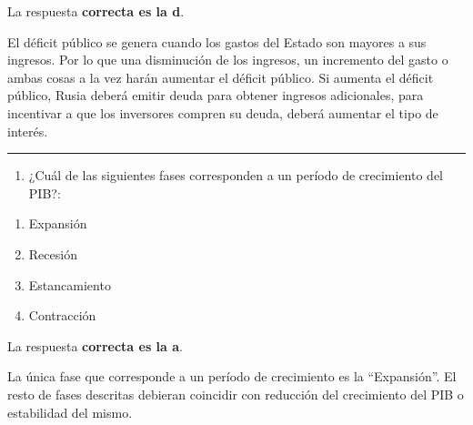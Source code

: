 \documentclass[
  letterpaper,
  DIV=11,
  numbers=noendperiod]{scrreprt}
\providecommand{\tightlist}{%
  \setlength{\itemsep}{0pt}\setlength{\parskip}{0pt}}\usepackage{longtable,booktabs,array}
\begin{document}
\begin{tcolorbox}[enhanced jigsaw, left=2mm, opacityback=0, colback=white, breakable, arc=.35mm, bottomrule=.15mm, rightrule=.15mm, toprule=.15mm, leftrule=.75mm, colframe=quarto-callout-tip-color-frame]
\begin{minipage}[t]{5.5mm}
\textcolor{quarto-callout-tip-color}{\faLightbulb}
\end{minipage}%
\begin{minipage}[t]{\textwidth - 5.5mm}

La respuesta \textbf{correcta es la d}.

El déficit público se genera cuando los gastos del Estado son mayores a
sus ingresos. Por lo que una disminución de los ingresos, un incremento
del gasto o ambas cosas a la vez harán aumentar el déficit público. Si
aumenta el déficit público, Rusia deberá emitir deuda para obtener
ingresos adicionales, para incentivar a que los inversores compren su
deuda, deberá aumentar el tipo de interés.

\end{minipage}%
\end{tcolorbox}

\begin{center}\rule{0.5\linewidth}{0.5pt}\end{center}

\begin{enumerate}
\def\labelenumi{\arabic{enumi}.}
\setcounter{enumi}{6}
\tightlist
\item
  ¿Cuál de las siguientes fases corresponden a un período de crecimiento
  del PIB?:
\end{enumerate}

\begin{enumerate}
\def\labelenumi{\alph{enumi})}
\item
  Expansión
\item
  Recesión
\item
  Estancamiento
\item
  Contracción
\end{enumerate}

\begin{tcolorbox}[enhanced jigsaw, left=2mm, opacityback=0, colback=white, breakable, arc=.35mm, bottomrule=.15mm, rightrule=.15mm, toprule=.15mm, leftrule=.75mm, colframe=quarto-callout-tip-color-frame]
\begin{minipage}[t]{5.5mm}
\textcolor{quarto-callout-tip-color}{\faLightbulb}
\end{minipage}%
\begin{minipage}[t]{\textwidth - 5.5mm}

La respuesta \textbf{correcta es la a}.

La única fase que corresponde a un período de crecimiento es la
``Expansión''. El resto de fases descritas debieran coincidir con
reducción del crecimiento del PIB o estabilidad del mismo.

\end{minipage}%
\end{tcolorbox}
\end{document}
